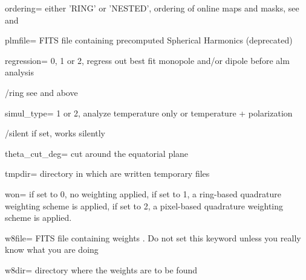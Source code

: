 \begin{keywords}
\begin{kwlist}{}
\item[ordering=]  either 'RING' or 'NESTED', ordering of online maps and masks,
see 
 and 

\item[plmfile=]  FITS file containing precomputed Spherical Harmonics (deprecated) 

\item[regression=]  0, 1 or 2, regress out best fit monopole and/or dipole before
    alm analysis

\item[/ring]  see 
 and 
 above

\item[simul\_type=]  1 or 2, analyze temperature only or temperature + polarization

\item[/silent]     if set, works silently

\item[theta\_cut\_deg=]  cut around the equatorial plane 

\item[tmpdir=]       directory in which are written temporary files 

\item[won=]      
if set to 0, no weighting applied, if set to 1, a ring-based quadrature weighting scheme is applied,
              if set to 2, a pixel-based quadrature weighting scheme is applied.

\item[w8file=]     FITS file containing weights 
     .
   Do not set this keyword unless you really know what you are doing

\item[w8dir=]      directory where the weights are to be found 

  \end{kwlist}
\end{keywords}  

